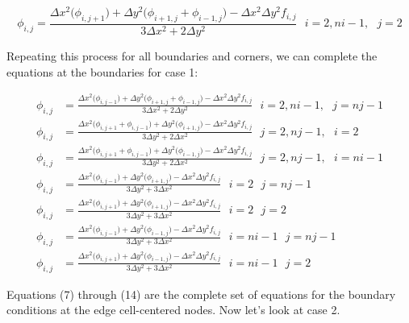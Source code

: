 \documentclass{article}
\begin{document}
\begin{equation}
\phi_{i,j} = \frac{ \Delta x^{2} \big(  \phi_{i,j+1} \big) + \Delta y^2 \big(  \phi_{i+1,j} + \phi_{i-1,j} \big) - \Delta x^{2} \Delta y^{2} f_{i,j}}{3 \Delta x^2  + 2 \Delta y^2} \ \ \ i=2,ni-1, \ \ \ j=2 
\end{equation}

\vspace{1em}

\noindent Repeating this process for all boundaries and corners, we can complete the equations at the boundaries for case 1:

\begin{align}
\phi_{i,j} &= \frac{ \Delta x^{2} \big(  \phi_{i,j-1}  \big) + \Delta y^2 \big(  \phi_{i+1,j} + \phi_{i-1,j} \big) - \Delta x^{2} \Delta y^{2} f_{i,j} }{3 \Delta x^2  + 2 \Delta y^2} \ \ \ i=2,ni-1, \ \ \ j=nj-1 \\
\phi_{i,j} &= \frac{ \Delta x^{2} \big( \phi_{i,j+1} + \phi_{i,j-1}  \big) + \Delta y^2 \big(  \phi_{i+1,j}  \big) - \Delta x^{2} \Delta y^{2} f_{i,j} }{3 \Delta y^2  + 2 \Delta x^2} \ \ \ j=2,nj-1, \ \ \ i=2 \\
\phi_{i,j} &= \frac{ \Delta x^{2} \big( \phi_{i,j+1} + \phi_{i,j-1}  \big) + \Delta y^2 \big(  \phi_{i-1,j}  \big) - \Delta x^{2} \Delta y^{2} f_{i,j} }{3 \Delta y^2  + 2 \Delta x^2} \ \ \ j=2,nj-1, \ \ \ i=ni-1 \\
\phi_{i,j} &= \frac{ \Delta x^{2} \big( \phi_{i,j-1}  \big) + \Delta y^2 \big(  \phi_{i+1,j}  \big) - \Delta x^{2} \Delta y^{2} f_{i,j} }{3 \Delta y^2  + 3 \Delta x^2} \ \ \ i=2 \ \ \ j=nj-1 \\
\phi_{i,j} &= \frac{ \Delta x^{2} \big( \phi_{i,j+1}  \big) + \Delta y^2 \big(  \phi_{i+1,j}  \big) - \Delta x^{2} \Delta y^{2} f_{i,j} }{3 \Delta y^2  + 3 \Delta x^2} \ \ \ i=2 \ \ \ j=2 \\
\phi_{i,j} &= \frac{ \Delta x^{2} \big( \phi_{i,j-1}  \big) + \Delta y^2 \big(  \phi_{i-1,j}  \big) - \Delta x^{2} \Delta y^{2} f_{i,j} }{3 \Delta y^2  + 3 \Delta x^2} \ \ \ i=ni-1 \ \ \ j=nj-1 \\
\phi_{i,j} &= \frac{ \Delta x^{2} \big( \phi_{i,j+1}  \big) + \Delta y^2 \big(  \phi_{i-1,j}  \big) - \Delta x^{2} \Delta y^{2} f_{i,j} }{3 \Delta y^2  + 3 \Delta x^2} \ \ \ i=ni-1 \ \ \ j=2 
\end{align}

\vspace{1em}

\noindent Equations (7) through (14) are the complete set of equations for the boundary conditions at the edge cell-centered nodes. Now let's look at case 2.
\end{document}
